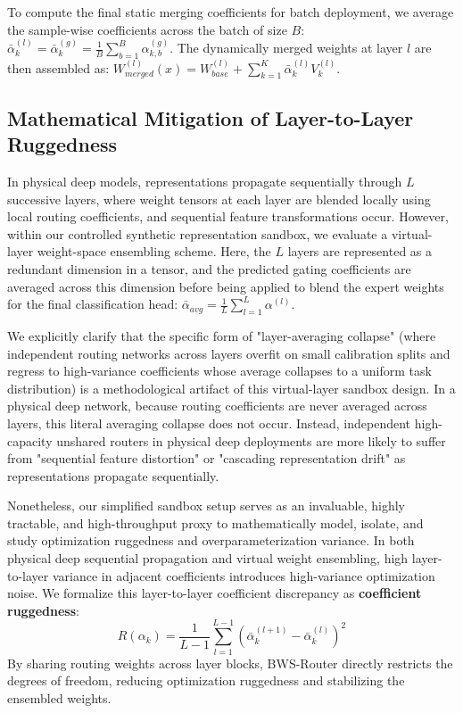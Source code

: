 To compute the final static merging coefficients for batch deployment, we average the sample-wise coefficients across the batch of size $B$: $\bar{\alpha}_k^{(l)} = \bar{\alpha}_k^{(g)} = \frac{1}{B} \sum_{b=1}^B \alpha_{k, b}^{(g)}$. The dynamically merged weights at layer $l$ are then assembled as: $W_{merged}^{(l)}(x) = W_{base}^{(l)} + \sum_{k=1}^K \bar{\alpha}_k^{(l)} V_k^{(l)}$.

\subsection{Mathematical Mitigation of Layer-to-Layer Ruggedness}
In physical deep models, representations propagate sequentially through $L$ successive layers, where weight tensors at each layer are blended locally using local routing coefficients, and sequential feature transformations occur. However, within our controlled synthetic representation sandbox, we evaluate a virtual-layer weight-space ensembling scheme. Here, the $L$ layers are represented as a redundant dimension in a tensor, and the predicted gating coefficients are averaged across this dimension before being applied to blend the expert weights for the final classification head: $\bar{\alpha}_{avg} = \frac{1}{L} \sum_{l=1}^L \alpha^{(l)}$. 

We explicitly clarify that the specific form of "layer-averaging collapse" (where independent routing networks across layers overfit on small calibration splits and regress to high-variance coefficients whose average collapses to a uniform task distribution) is a methodological artifact of this virtual-layer sandbox design. In a physical deep network, because routing coefficients are never averaged across layers, this literal averaging collapse does not occur. Instead, independent high-capacity unshared routers in physical deep deployments are more likely to suffer from "sequential feature distortion" or "cascading representation drift" as representations propagate sequentially. 

Nonetheless, our simplified sandbox setup serves as an invaluable, highly tractable, and high-throughput proxy to mathematically model, isolate, and study optimization ruggedness and overparameterization variance. In both physical deep sequential propagation and virtual weight ensembling, high layer-to-layer variance in adjacent coefficients introduces high-variance optimization noise. We formalize this layer-to-layer coefficient discrepancy as \textbf{coefficient ruggedness}:
\begin{equation}
    R(\alpha_k) = \frac{1}{L-1} \sum_{l=1}^{L-1} \left( \bar{\alpha}_k^{(l+1)} - \bar{\alpha}_k^{(l)} \right)^2
\end{equation}
By sharing routing weights across layer blocks, BWS-Router directly restricts the degrees of freedom, reducing optimization ruggedness and stabilizing the ensembled weights.

